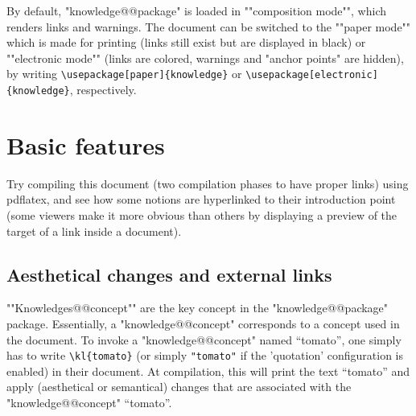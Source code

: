 \documentclass{article}
\begin{document}
By default, "knowledge@@package" is loaded in \AP""composition mode"", which renders 
links and warnings. The document can be switched to the \AP""paper mode""
which is made for printing (links still exist but are displayed in black)
or \AP""electronic mode"" (links are colored, warnings and "anchor points"
are hidden), by writing \verb|\usepackage[paper]{knowledge}|
or \verb|\usepackage[electronic]{knowledge}|, respectively.

\section{Basic features}

Try compiling this document (two compilation phases to have proper links) using pdflatex, and see how some notions are hyperlinked to their introduction point (some viewers make it more obvious than others by displaying a preview of the target of a link inside a document).

\subsection{Aesthetical changes and external links}

\AP""Knowledges@@concept"" are the key concept in the "knowledge@@package" 
package. Essentially, a "knowledge@@concept" corresponds to a concept used in 
the document. To invoke a "knowledge@@concept" named ``tomato'', one simply has 
to write \verb|\kl{tomato}| (or simply
%
\verb|"tomato"|%
%
if the 'quotation' 
configuration is enabled) in their document. At compilation, this will 
print the text ``tomato'' and apply (aesthetical or semantical) changes that
are associated with the "knowledge@@concept" ``tomato''.
\end{document}
